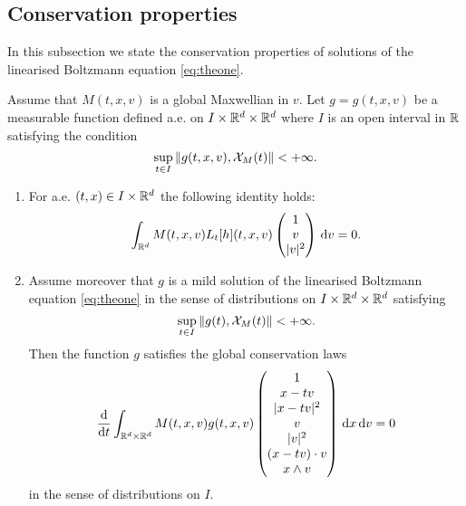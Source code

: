 \subsection{Conservation properties} %
\label{sub:conservation_properties}
In this subsection we state the conservation properties of solutions of the linearised Boltzmann equation \eqref{eq:theone}.
\begin{theorem}
	\label{th:conserv}
	Assume that $M(t,x,v)$ is a global Maxwellian in $v$. Let $g=g(t,x,v)$ be a measurable function defined a.e. on $I\times{{\mathbb R^d}\times{\mathbb R^d}}$ where $I$ is an open interval in ${\mathbb R}$ satisfying the condition
	\[\sup_{t\in I}\|g(t,x,v),{\mathcal X_M(t)}\|<+\infty.\]
	
	\begin{enumerate}
		\item  For a.e. $(t,x)\in I\times {\mathbb R^d}$ the following identity holds:
		\[\int_{{\mathbb R^d}} M(t,x,v) L_t[h](t,x,v)\begin{pmatrix}
			1\\v\\|v|^2
		\end{pmatrix}{\,\mathrm{d} v}=0.\]
		\item Assume moreover that  $g$ is a mild solution of the linearised Boltzmann equation \eqref{eq:theone} in the sense of distributions on $I\times{{\mathbb R^d}\times{\mathbb R^d}}$ satisfying \[\sup_{t\in I}\|g(t),{\mathcal X_M(t)}\|<+ \infty .\] Then
		the function $g$ satisfies the global conservation laws
		\[\frac{\mathrm d}{\mathrm dt}\int_{{{\mathbb R^d}\times{\mathbb R^d}}} M(t,x,v)g(t,x,v)\begin{pmatrix}
			1\\
			x-tv\\
			|x-tv|^2\\
			v\\
			|v|^2\\
			(x-tv)\cdot v\\
			x\wedge v
		\end{pmatrix}{\,\mathrm{d} x}{\,\mathrm{d} v}=0\]
		in the sense of distributions on $I$.
	\end{enumerate}
\end{theorem}

